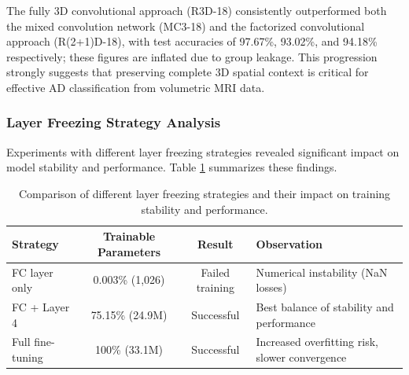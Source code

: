 \documentclass[12pt, a4paper]{article}
\begin{document}

The fully 3D convolutional approach (R3D-18) consistently outperformed both the mixed convolution network (MC3-18) and the factorized convolutional approach (R(2+1)D-18), with test accuracies of 97.67\%, 93.02\%, and 94.18\% respectively; these figures are inflated due to group leakage. This progression strongly suggests that preserving complete 3D spatial context is critical for effective AD classification from volumetric MRI data.


\subsubsection{Layer Freezing Strategy Analysis}

Experiments with different layer freezing strategies revealed significant impact on model stability and performance. Table \ref{tab:freezing_strategies} summarizes these findings.

\begin{table}[htbp]
\centering
\begin{tabular}{|l|c|c|p{4cm}|}
\hline
\textbf{Strategy} & \textbf{Trainable Parameters} & \textbf{Result} & \textbf{Observation} \\
\hline
FC layer only & 0.003\% (1,026) & Failed training & Numerical instability (NaN losses) \\
\hline
FC + Layer 4 & 75.15\% (24.9M) & Successful & Best balance of stability and performance \\
\hline
Full fine-tuning & 100\% (33.1M) & Successful & Increased overfitting risk, slower convergence \\
\hline
\end{tabular}
\caption{Comparison of different layer freezing strategies and their impact on training stability and performance.}
\label{tab:freezing_strategies}
\end{table}
\end{document}
